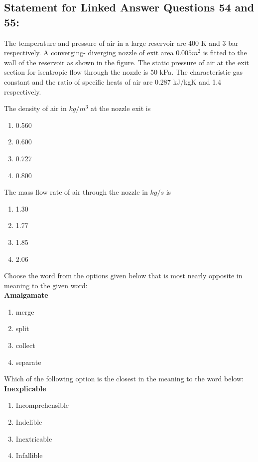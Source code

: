 \subsection*{\textbf{Statement for Linked Answer Questions 54 and 55:}}
The temperature and pressure of air in a large reservoir are 400 K and 3 bar respectively. A converging- diverging nozzle of exit area $0.005 m^2$ is fitted to the wall of the reservoir as shown in the figure. The static pressure of air at the exit section for isentropic flow through the nozzle is 50 kPa. The characteristic gas constant and the ratio of specific heats of air are 0.287 kJ/kgK and 1.4 respectively.
		
\item The density of air in $kg/m^3$ at the nozzle exit is 
\begin{enumerate}
    \item 0.560
    \item 0.600
    \item 0.727
    \item 0.800
\end{enumerate}
\item The mass flow rate of air through the nozzle in $kg/s$ is
\begin{enumerate}
    \item 1.30
    \item 1.77
    \item 1.85
    \item 2.06
\end{enumerate}
\item Choose the word from the options given below that is most nearly opposite in meaning to the given word:\\ \textbf{Amalgamate} 
\begin{enumerate}
    \item merge
    \item split
    \item collect
    \item separate
\end{enumerate}
\item Which of the following option is the closest in the meaning to the word below: \\ \textbf{Inexplicable}
\begin{enumerate}
    \item Incomprehensible
    \item Indelible
    \item Inextricable
    \item Infallible
\end{enumerate}
